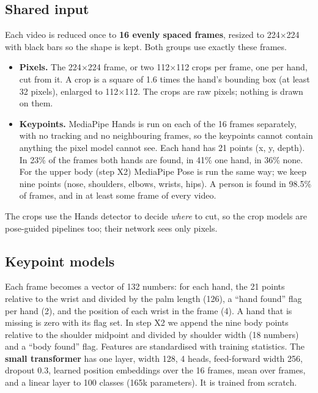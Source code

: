 \documentclass{article}
\begin{document}
\subsection{Shared input}\label{sec:shared}
Each video is reduced once to \textbf{16 evenly spaced frames}, resized to 224$\times$224 with black bars so the
shape is kept. Both groups use exactly these frames.
\begin{itemize}
\item \textbf{Pixels.} The 224$\times$224 frame, or two 112$\times$112 crops per frame, one per hand, cut from it.
      A crop is a square of 1.6 times the hand's bounding box (at least 32 pixels), enlarged to 112$\times$112.
      The crops are raw pixels; nothing is drawn on them.
\item \textbf{Keypoints.} MediaPipe Hands \citep{lugaresi2019mediapipe,zhang2020mediapipehands} is run on each of the 16
      frames separately, with no tracking and no neighbouring frames, so the keypoints cannot contain anything the
      pixel model cannot see. Each hand has 21 points (x, y, depth). In 23\% of the frames both hands are found,
      in 41\% one hand, in 36\% none.
      For the upper body (step X2) MediaPipe Pose \citep{bazarevsky2020blazepose} is run the same way; we keep nine
      points (nose, shoulders, elbows, wrists, hips). A person is found in 98.5\% of frames, and in at least some frame
      of every video.
\end{itemize}
The crops use the Hands detector to decide \emph{where} to cut, so the crop models are pose-guided pipelines too;
their network sees only pixels.

\subsection{Keypoint models}
Each frame becomes a vector of 132 numbers: for each hand, the 21 points relative to the wrist and divided by the palm
length (126), a ``hand found'' flag per hand (2), and the position of each wrist in the frame (4). A hand that is
missing is zero with its flag set. In step X2 we append the nine body points relative to the shoulder midpoint and
divided by shoulder width (18 numbers) and a ``body found'' flag. Features are standardised with training statistics.
The \textbf{small transformer} \citep{vaswani2017attention} has one layer, width 128, 4 heads, feed-forward width 256,
dropout 0.3, learned position embeddings over the 16 frames, mean over frames, and a linear layer to 100 classes
(165k parameters). It is trained from scratch.
\end{document}

